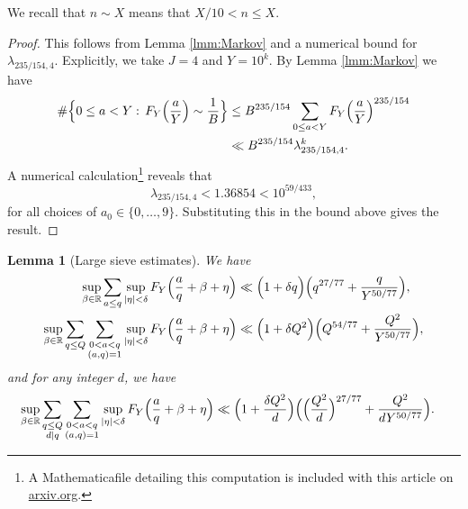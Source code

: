 \documentclass[10pt]{amsart}
\theoremstyle{plain}
\newtheorem{lmm}[thrm]{Lemma}
\numberwithin{sblmm}{thrm}
\numberwithin{equation}{section}
\begin{document}
%
%
%
%
We recall that $n\sim X$ means that $X/10<n\le X$.
%
%
%
\begin{proof}
%
This follows from Lemma \ref{lmm:Markov} and a numerical bound for $\lambda_{235/154,4}$. Explicitly, we take $J=4$ and $Y=10^k$. By Lemma \ref{lmm:Markov} we have
%
\begin{align*}
\#\Bigl\{0\le a<Y:\,F_Y\Bigl(\frac{a}{Y}\Bigr)\sim \frac{1}{B}\Bigr\}&\le  B^{235/154}\sum_{0\le a<Y}F_{Y}\Bigl(\frac{a}{Y}\Bigr)^{235/154}\\
&\ll B^{235/154}\lambda_{235/154,4}^k.
\end{align*}
%
A numerical calculation\footnote{A Mathematica\textregistered\;file detailing this computation is included with this article on \url{arxiv.org}.} reveals that
\[
\lambda_{235/154,4}<1.36854<10^{59/433},
\]
for all choices of $a_0\in\{0,\dots,9\}$. Substituting this in the bound above gives the result.
%
\end{proof}
%
%
%
%
\begin{lmm}[Large sieve estimates]\label{lmm:LargeSieve}
%
We have
\begin{align*}
\sup_{\beta\in\mathbb{R}}\sum_{a\le q}\sup_{|\eta|< \delta}F_{Y}\Bigl(\frac{a}{q}+\beta+\eta\Bigr)&\ll \Bigl(1+\delta q\Bigr)\Bigl(q^{27/77}+ \frac{q}{Y^{50/77}}\Bigr),\\
\sup_{\beta\in\mathbb{R}}\sum_{q\le Q}\sum_{\substack{0<a<q\\ (a,q)=1}}\sup_{|\eta|<\delta}F_{Y}\Bigl(\frac{a}{q}+\beta+\eta\Bigr)&\ll  \Bigl(1+\delta Q^2\Bigr)\Bigl(Q^{54/77}+\frac{Q^2}{Y^{50/77}}\Bigr),
\end{align*}
and for any integer $d$, we have
\begin{align*}
\sup_{\beta\in\mathbb{R}}\sum_{\substack{q\le Q\\ d|q}}\sum_{\substack{0<a<q\\ (a,q)=1}}\sup_{|\eta|<\delta}F_{Y}\Bigl(\frac{a}{q}+\beta+\eta\Bigr)&\ll \Bigl(1+\frac{\delta Q^2}{d}\Bigr) \Bigl(\Bigl(\frac{Q^2}{d}\Bigr)^{27/77}+\frac{Q^2}{d Y^{50/77}}\Bigr).
\end{align*}
%
\end{lmm}
%
%
%
%
\end{document}
